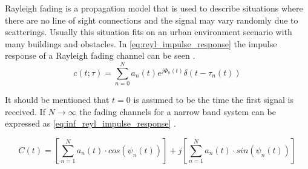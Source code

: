 Rayleigh fading is a propagation model that is used to describe situations where there are no line of sight connections and the signal may vary randomly due to scatterings. Usually this situation fits on an urban environment scenario with many buildings and obstacles. In \autoref{eq:reyl_impulse_response} the impulse response of a Rayleigh fading channel can be seen \citep{MeasurementComplexRay}.
\begin{equation}\label{eq:reyl_impulse_response}
c(t;\tau) = \sum_{n =0}^{N} a_n(t)e^{j\Phi_n(t)} \delta (t-\tau_n(t))
\end{equation}

\begin{where}
\end{where}


It should be mentioned that $t=0$ is assumed to be the time the first signal is received. If $N \rightarrow \infty$ the fading channels for a narrow band system can be expressed as \autoref{eq:inf_reyl_impulse_response} \citep{MeasurementComplexRay}. 

\begin{equation}\label{eq:inf_reyl_impulse_response}
C(t) = \left [ \sum_{n =1}^{N} a_n(t)\cdot cos(\psi_n (t))\right ] + j\left [\sum_{n =1}^{N} a_n(t)\cdot sin(\psi_n (t))  \right ]
\end{equation}
\begin{where}
\end{where}


